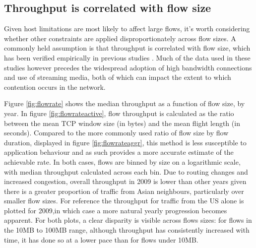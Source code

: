 \subsection{Throughput is correlated with flow size}

Given host limitations are most likely to affect large flows, it's worth considering whether other constraints are applied disproportionately across flow sizes. 
A commonly held assumption is that throughput is correlated with flow size, which has been verified empirically in previous studies \cite{oursTCP, Zhang:2002p85}.
Much of the data used in these studies however precedes the widespread adoption of high bandwidth connections and use of streaming media, both of which can impact the extent to which contention occurs in the network.

Figure \ref{fig:flowrate} shows the median throughput as a function of flow size, by year.
In figure \ref{fig:flowrateactive}, flow throughput is calculated as the ratio between the mean \ac{TCP} window size (in bytes) and the mean flight length (in seconds).
Compared to the more commonly used ratio of flow size by flow duration, displayed in figure \ref{fig:flowrateaggr}, this method is less susceptible to application behaviour and as such provides a more accurate estimate of the achievable rate.
In both cases, flows are binned by size on a logarithmic scale, with median throughput calculated across each bin.
Due to routing changes and increased congestion, overall throughput in 2009 is lower than other years given there is a greater proportion of traffic from Asian neighbours, particularly over smaller flow sizes.
For reference the throughput for traffic from the US alone is plotted for 2009,in which case a more natural yearly progression becomes apparent.
For both plots, a clear disparity is visible across flows sizes: for flows in the 10MB to 100MB range, although throughput has consistently increased with time, it has done so at a lower pace than for flows under 10MB. 


